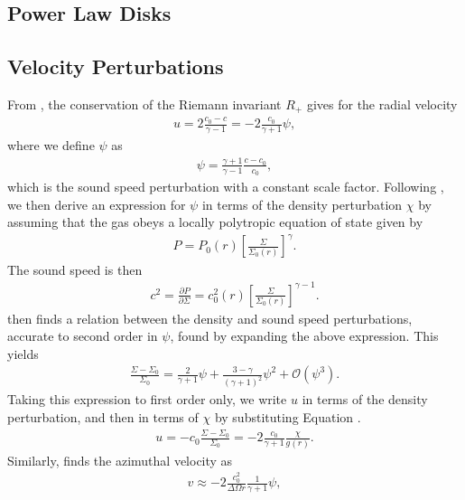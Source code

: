 \subsection{Power Law Disks}

\subsection{Velocity Perturbations} \label{sec:velocity_perts}

From \citet{rafikov2002a}, the conservation of the Riemann invariant $R_+$ gives for the radial velocity
\begin{align}
    u = 2\frac{c_0-c}{\gamma - 1}=-2\frac{c_0}{\gamma + 1} \psi, \label{eq:u_rafikov}
\end{align}
where we define $\psi$ as
\begin{align}
    \psi = \frac{\gamma+1}{\gamma-1} \frac{c - c_0}{c_0},
\end{align}
which is the sound speed perturbation with a constant scale factor. Following \citet{rafikov2002a}, we then derive an expression for $\psi$ in terms of the density perturbation $\chi$ by assuming that the gas obeys a locally polytropic equation of state given by 
\begin{align}
    P = P_0(r) \left[ \frac{\Sigma}{\Sigma_0(r)} \right]^\gamma. \label{eq:poly_EOS}
\end{align}
The sound speed is then
\begin{align}
    c^2 = \frac{\partial P}{\partial \Sigma} = c_0^2(r) \left[ \frac{\Sigma}{\Sigma_0(r)} \right]^{\gamma-1}.
\end{align}
\citet{rafikov2002a} then finds a relation between the density and sound speed perturbations, accurate to second order in $\psi$, found by expanding the above expression. 
This yields
\begin{align}
    \frac{\Sigma - \Sigma_0}{\Sigma_0} = \frac{2}{\gamma + 1}\psi + \frac{3 - \gamma}{\left( \gamma + 1  \right)^2} \psi^2 + \mathcal{O}(\psi^3). \label{eq:psi_exp}
\end{align}
Taking this expression to first order only, we write $u$ in terms of the density perturbation, and then in terms of $\chi$ by substituting Equation \feqr. 
\begin{align}
    u = - c_0 \frac{\Sigma - \Sigma_0}{\Sigma_0} = -2 \frac{c_0}{\gamma + 1} \frac{\chi}{g(r)}. \label{eq:ap_rad_vel}
\end{align}
Similarly, \citet{rafikov2002a} finds the azimuthal velocity as
\begin{align}
    v \approx -2 \frac{c_0^2}{\Delta\Omega r} \frac{1}{\gamma + 1} \psi, \label{eq:v_rafikov}
\end{align}
